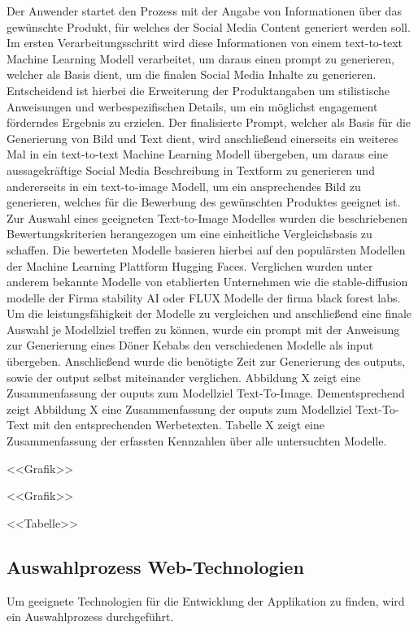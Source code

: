 Der Anwender startet den Prozess mit der Angabe von Informationen über das gewünschte Produkt, für welches der Social Media Content generiert werden soll.
Im ersten Verarbeitungsschritt wird diese Informationen von einem text-to-text Machine Learning Modell verarbeitet, um daraus einen prompt zu generieren, welcher als Basis dient, um die finalen Social Media Inhalte zu generieren. Entscheidend ist hierbei die Erweiterung der Produktangaben um stilistische Anweisungen und werbespezifischen Details, um ein möglichst engagement förderndes Ergebnis zu erzielen. Der finalisierte Prompt, welcher als Basis für die Generierung von Bild und Text dient, wird anschließend einerseits ein weiteres Mal in ein text-to-text Machine Learning Modell übergeben, um daraus eine aussagekräftige Social Media Beschreibung in Textform zu generieren und andererseits in ein text-to-image Modell, um ein ansprechendes Bild zu generieren, welches für die Bewerbung des gewünschten Produktes geeignet ist.
Zur Auswahl eines geeigneten Text-to-Image Modelles wurden die beschriebenen Bewertungskriterien herangezogen um eine einheitliche Vergleichsbasis zu schaffen.
Die bewerteten Modelle basieren hierbei auf den populärsten Modellen der Machine Learning Plattform Hugging Faces.
Verglichen wurden unter anderem bekannte Modelle von etablierten Unternehmen wie die stable-diffusion modelle der Firma stability AI oder FLUX Modelle der firma black forest labs.
Um die leistungsfähigkeit der Modelle zu vergleichen und anschließend eine finale Auswahl je Modellziel treffen zu können, wurde ein prompt mit der Anweisung zur Generierung eines Döner Kebabs den verschiedenen Modelle als input übergeben. Anschließend wurde die benötigte Zeit zur Generierung des outputs, sowie der output selbst miteinander verglichen. Abbildung X zeigt eine Zusammenfassung der ouputs zum Modellziel Text-To-Image. Dementsprechend zeigt Abbildung X eine Zusammenfassung der ouputs zum Modellziel Text-To-Text mit den entsprechenden Werbetexten. Tabelle X zeigt eine Zusammenfassung der erfassten Kennzahlen über alle untersuchten Modelle.

<<Grafik>>

<<Grafik>>

<<Tabelle>>

\subsection{Auswahlprozess Web-Technologien}
Um geeignete Technologien für die Entwicklung der Applikation zu finden, wird ein Auswahlprozess durchgeführt.

